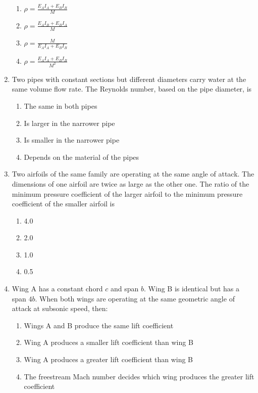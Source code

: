 \documentclass{article}
\begin{document}
\begin{enumerate}
    \begin{multicols}{2}
    \begin{enumerate}
        \item $\rho = \frac{E_A I_A + E_B I_B}{M}$ 
        \item $\rho = \frac{E_A I_B + E_B I_A}{M}$
        \item $\rho = \frac{M}{E_A I_A + E_B I_B}$ 
        \item $\rho = \frac{E_A I_A + E_B I_B}{M^2}$
    \end{enumerate}
    \end{multicols}    
        

    \item Two pipes with constant sections but different diameters carry water at the same volume flow rate. The Reynolds number, based on the pipe diameter, is 
    \begin{enumerate}
        \item The same in both pipes
        \item Is larger in the narrower pipe
        \item Is smaller in the narrower pipe
        \item Depends on the material of the pipes
    \end{enumerate}
        

    \item Two airfoils of the same family are operating at the same angle of attack. The dimensions of one airfoil are twice as large as the other one. The ratio of the minimum pressure coefficient of the larger airfoil to the minimum pressure coefficient of the smaller airfoil is 
    \begin{multicols}{4}
    \begin{enumerate}
        \item 4.0 
        \item 2.0 
        \item 1.0 
        \item 0.5
    \end{enumerate}
    \end{multicols}
        

    \item Wing A has a constant chord $c$ and span $b$. Wing B is identical but has a span $4b$. When both wings are operating at the same geometric angle of attack at subsonic speed, then: 
    \begin{enumerate}
        \item Wings A and B produce the same lift coefficient
        \item Wing A produces a smaller lift coefficient than wing B
        \item Wing A produces a greater lift coefficient than wing B
        \item The freestream Mach number decides which wing produces the greater lift coefficient
    \end{enumerate}
        


\end{enumerate}
\end{document}

